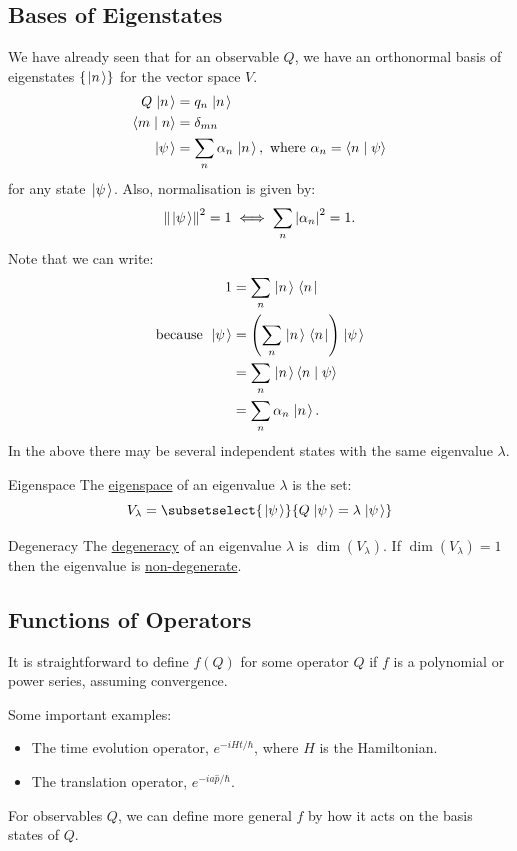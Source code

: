 \documentclass[../Main.tex]{subfiles}
\begin{document}
\subsection{Bases of Eigenstates}
We have already seen that for an observable $Q$, we have an orthonormal basis of eigenstates $\{\left.\left|n\right.\right\rangle\}$ for the vector space $V$.
\begin{align*}
    Q\left.\left|n\right.\right\rangle &= q_n \left.\left|n\right.\right\rangle \\
    \langle m\mid n\rangle &= \delta_{mn} \\
    \left.\left|\psi\right.\right\rangle &= \sum_n \alpha_n \left.\left|n\right.\right\rangle,~\text{where }\alpha_n = \langle n\mid\psi\rangle
\end{align*}
for any state $\left.\left|\psi\right.\right\rangle$. Also, normalisation is given by:
\begin{equation*}
    \left\|\left.\left|\psi\right.\right\rangle\right\|^2 = 1 \iff \sum_n \left|\alpha_n\right|^2 = 1.
\end{equation*}
Note that we can write:
\begin{align*}
    1 &= \sum_n \left.\left|n\right.\right\rangle\left.\left\langle n\right.\right| \\
    \text{because } \left.\left|\psi\right.\right\rangle &= \left(\sum_{n} \left.\left|n\right.\right\rangle \left.\left\langle n\right.\right|\right) \left.\left|\psi\right.\right\rangle \\
    &= \sum_n \left.\left|n\right.\right\rangle \langle n\mid\psi\rangle \\
    &= \sum_n \alpha_n \left.\left|n\right.\right\rangle.
\end{align*}
In the above there may be several independent states with the same eigenvalue $\lambda$.
\begin{definition}{Eigenspace}
    The \underline{eigenspace} of an eigenvalue $\lambda$ is the set:
    \begin{equation*}
        V_\lambda = \subsetselect{\state}{Q\state = \lambda \state}
    \end{equation*}
\end{definition}
\begin{definition}{Degeneracy}
    The \underline{degeneracy} of an eigenvalue $\lambda$ is $\dim(V_\lambda)$. If $\dim(V_\lambda) = 1$ then the eigenvalue is \underline{non-degenerate}.
\end{definition}
\subsection{Functions of Operators}
It is straightforward to define $f(Q)$ for some operator $Q$ if $f$ is a polynomial or power series, assuming convergence.

Some important examples:
\begin{itemize}
    \item The time evolution operator, $e^{-iHt/\hbar}$, where $H$ is the Hamiltonian.
    \item The translation operator, $e^{-ia\hat{p} / \hbar}$.
\end{itemize}
For observables $Q$, we can define more general $f$ by how it acts on the basis states of $Q$.
\end{document}
